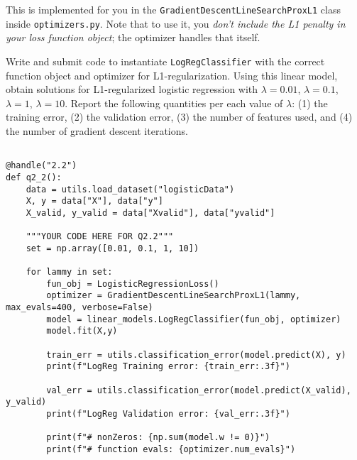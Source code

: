\documentclass{article}
\newenvironment{asking}{\begingroup\color{blu}}{\endgroup}
\begin{document}

This is implemented for you in the \verb|GradientDescentLineSearchProxL1| class inside \verb|optimizers.py|.
Note that to use it, you \emph{don't include the L1 penalty in your loss function object};
the optimizer handles that itself.

\begin{asking}Write and submit code to instantiate \verb|LogRegClassifier| with the correct function object and optimizer for L1-regularization. Using this linear model, obtain solutions for L1-regularized logistic regression with $\lambda = 0.01$, $\lambda = 0.1$, $\lambda = 1$, $\lambda = 10$. Report the following quantities per each value of $\lambda$: (1) the training error, (2) the validation error, (3) the number of features used, and (4) the number of gradient descent iterations.\end{asking}

\begin{verbatim}

@handle("2.2")
def q2_2():
    data = utils.load_dataset("logisticData")
    X, y = data["X"], data["y"]
    X_valid, y_valid = data["Xvalid"], data["yvalid"]

    """YOUR CODE HERE FOR Q2.2"""
    set = np.array([0.01, 0.1, 1, 10])

    for lammy in set:
        fun_obj = LogisticRegressionLoss()
        optimizer = GradientDescentLineSearchProxL1(lammy, max_evals=400, verbose=False)
        model = linear_models.LogRegClassifier(fun_obj, optimizer)
        model.fit(X,y)

        train_err = utils.classification_error(model.predict(X), y)
        print(f"LogReg Training error: {train_err:.3f}")

        val_err = utils.classification_error(model.predict(X_valid), y_valid)
        print(f"LogReg Validation error: {val_err:.3f}")

        print(f"# nonZeros: {np.sum(model.w != 0)}")
        print(f"# function evals: {optimizer.num_evals}")
    
\end{verbatim}
\end{document}
